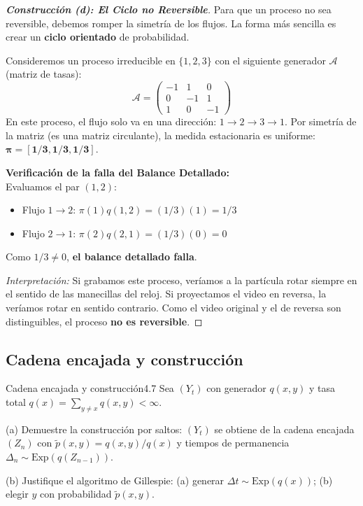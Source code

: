 \documentclass[10pt,a4paper]{article}
\begin{document}
\begin{proof}[\textbf{Construcción (d): El Ciclo no Reversible}]
    Para que un proceso no sea reversible, debemos romper la simetría de los flujos. La forma más sencilla es crear un \textbf{ciclo orientado} de probabilidad.
    
    Consideremos un proceso irreducible en $\{1, 2, 3\}$ con el siguiente generador $\mathcal{A}$ (matriz de tasas):
    \[
    \mathcal{A} = \begin{pmatrix}
    -1 & 1 & 0 \\
    0 & -1 & 1 \\
    1 & 0 & -1
    \end{pmatrix}
    \]
    En este proceso, el flujo solo va en una dirección: $1 \to 2 \to 3 \to 1$.
    Por simetría de la matriz (es una matriz circulante), la medida estacionaria es uniforme: $\mathbf{\pi = [1/3, 1/3, 1/3]}$.
    
    \textbf{Verificación de la falla del Balance Detallado:} \\
    Evaluamos el par $(1, 2)$:
    \begin{itemize}
        \item Flujo $1 \to 2$: $\pi(1)q(1, 2) = (1/3)(1) = 1/3$
        \item Flujo $2 \to 1$: $\pi(2)q(2, 1) = (1/3)(0) = 0$
    \end{itemize}
    Como $1/3 \neq 0$, \textbf{el balance detallado falla}. 
    
    \textit{Interpretación:} Si grabamos este proceso, veríamos a la partícula rotar siempre en el sentido de las manecillas del reloj. Si proyectamos el video en reversa, la veríamos rotar en sentido contrario. Como el video original y el de reversa son distinguibles, el proceso \textbf{no es reversible}.
\end{proof}

\newpage
\subsection{Cadena encajada y construcción}

\vspace{5mm}

\begin{ejercicio}{Cadena encajada y construcción}{4.7}
    Sea $(Y_t)$ con generador $q(x,y)$ y tasa total $q(x) = \sum_{y \neq x} q(x,y) < \infty$.
    
    (a) Demuestre la construcción por saltos: $(Y_t)$ se obtiene de la cadena encajada $(Z_n)$ con $\tilde{p}(x,y) = q(x,y)/q(x)$ y tiempos de permanencia $\Delta_n \sim \text{Exp}(q(Z_{n-1}))$.
    
    (b) Justifique el algoritmo de Gillespie: (a) generar $\Delta t \sim \text{Exp}(q(x))$; (b) elegir $y$ con probabilidad $\tilde{p}(x,y)$.
\end{ejercicio}
\end{document}
